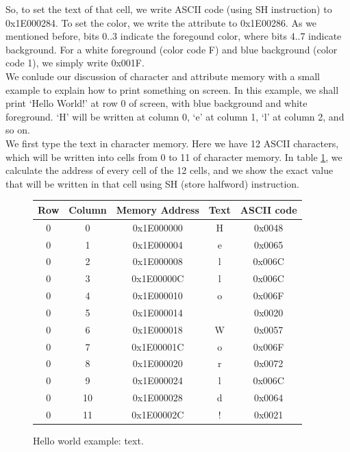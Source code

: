 \documentclass[oneside]{book}
\begin{document}
So, to set the text of that cell, we write ASCII code (using SH instruction) to
0x1E000284. To set the color, we write the attribute to 0x1E00286. As we mentioned
before, bits 0..3 indicate the foregound color, where bits 4..7 indicate background.
For a white foreground (color code F) and blue background (color code 1), we
simply write 0x001F.\\ 

We conlude our discussion of character and attribute memory with a small
example to explain how to print something on screen. In this example, 
we shall print `Hello World!' at row 0 of screen, with blue background
and white foreground. `H' will be written at column 0, `e' at column 1,
`l' at column 2, and so on.\\

We first type the text in character memory. Here we have 12 ASCII characters,
which will be written into cells from 0 to 11 of character memory. In table
\ref{hw1}, we  calculate the address of every cell of the 12 cells, and we 
show the exact value that will be written in that cell using SH 
(store halfword) instruction.\\

\begin{figure}[H]
\begin{center}
\begin{tabular}{|c|c|c|c|c|}

\hline \textbf{Row} & \textbf{Column} &
       \textbf{Memory Address} & \textbf{Text} & \textbf{ASCII code}  \\

\hline 0 & 0  & 0x1E000000 & H & 0x0048 \\
\hline 0 & 1  & 0x1E000004 & e & 0x0065 \\
\hline 0 & 2  & 0x1E000008 & l & 0x006C \\
\hline 0 & 3  & 0x1E00000C & l & 0x006C \\
\hline 0 & 4  & 0x1E000010 & o & 0x006F \\
\hline 0 & 5  & 0x1E000014 &   & 0x0020 \\
\hline 0 & 6  & 0x1E000018 & W & 0x0057 \\
\hline 0 & 7  & 0x1E00001C & o & 0x006F \\
\hline 0 & 8  & 0x1E000020 & r & 0x0072 \\
\hline 0 & 9  & 0x1E000024 & l & 0x006C \\
\hline 0 & 10 & 0x1E000028 & d & 0x0064 \\
\hline 0 & 11 & 0x1E00002C & ! & 0x0021 \\

\hline

\end{tabular}
\end{center}
\caption{Hello world example: text.}
\label{hw1}
\end{figure}
\end{document}
